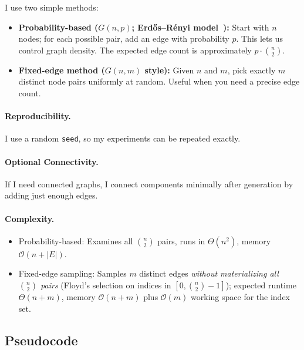 \documentclass[12pt]{article}
\begin{document}
I use two simple methods:

\begin{itemize}
    \item \textbf{Probability-based ($G(n,p)$; Erd\H{o}s--R\'enyi model~\cite{ErdosRenyi1959,Gilbert1959}):}
    Start with \(n\) nodes; for each possible pair, add an edge with probability \(p\). This lets us control graph density. The expected edge count is approximately \(p \cdot \binom{n}{2}\).

    \item \textbf{Fixed-edge method ($G(n,m)$ style):}
    Given \(n\) and \(m\), pick exactly \(m\) distinct node pairs uniformly at random. Useful when you need a precise edge count.
\end{itemize}

\paragraph{Reproducibility.}
I use a random \texttt{seed}, so my experiments can be repeated exactly.

\paragraph{Optional Connectivity.}
If I need connected graphs, I connect components minimally after generation by adding just enough edges.

\paragraph{Complexity.}
\begin{itemize}
  \item Probability-based: Examines all \(\binom{n}{2}\) pairs, runs in \(\Theta(n^2)\), memory \(\mathcal{O}(n+|E|)\).
  \item Fixed-edge sampling: Samples \(m\) distinct edges \emph{without materializing all \(\binom{n}{2}\) pairs} (Floyd's selection on indices in \([0,\binom{n}{2}-1]\)); expected runtime \(\Theta(n+m)\), memory \(\mathcal{O}(n+m)\) plus \(\mathcal{O}(m)\) working space for the index set.
\end{itemize}

\subsection{Pseudocode}
\end{document}
